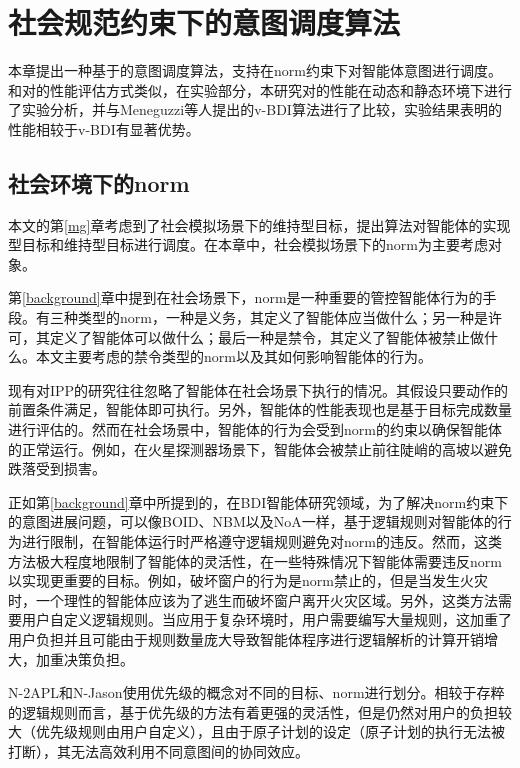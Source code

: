 \chapter{社会规范约束下的意图调度算法}\label{norm}
本章提出一种基于\SA 的意图调度算法\SAN ，\SAN 支持在norm约束下对智能体意图进行调度。和对\SAN 的性能评估方式类似，在实验部分，本研究对\SAN 的性能在动态和静态环境下进行了实验分析，并与Meneguzzi等人提出的v-BDI\cite{DBLP:journals/eaai/MeneguzziROVL15}算法进行了比较，实验结果表明\SAN 的性能相较于v-BDI有显著优势。
\section{社会环境下的norm}
本文的第\ref{mg}章考虑到了社会模拟场景下的维持型目标，提出\SAM 算法对智能体的实现型目标和维持型目标进行调度。在本章中，社会模拟场景下的norm为主要考虑对象。

第\ref{background}章中提到在社会场景下，norm是一种重要的管控智能体行为的手段\cite{DBLP:journals/mags/SavarimuthuC11}。有三种类型的norm，一种是义务，其定义了智能体应当做什么；另一种是许可，其定义了智能体可以做什么；最后一种是禁令，其定义了智能体被禁止做什么。本文主要考虑的禁令类型的norm以及其如何影响智能体的行为。

现有对IPP的研究往往忽略了智能体在社会场景下执行的情况。其假设只要动作的前置条件满足，智能体即可执行。另外，智能体的性能表现也是基于目标完成数量进行评估的。然而在社会场景中，智能体的行为会受到norm的约束以确保智能体的正常运行。例如，在火星探测器场景下，智能体会被禁止前往陡峭的高坡以避免跌落受到损害。

正如第\ref{background}章中所提到的，在BDI智能体研究领域，为了解决norm约束下的意图进展问题，可以像BOID\cite{DBLP:conf/agents/BroersenDHHT01}、NBM\cite{DBLP:conf/atal/MeneguzziL09}以及NoA\cite{DBLP:conf/ijcai/KollingbaumN03}一样，基于逻辑规则对智能体的行为进行限制，在智能体运行时严格遵守逻辑规则避免对norm的违反。然而，这类方法极大程度地限制了智能体的灵活性，在一些特殊情况下智能体需要违反norm以实现更重要的目标。例如，破坏窗户的行为是norm禁止的，但是当发生火灾时，一个理性的智能体应该为了逃生而破坏窗户离开火灾区域。另外，这类方法需要用户自定义逻辑规则。当应用于复杂环境时，用户需要编写大量规则，这加重了用户负担并且可能由于规则数量庞大导致智能体程序进行逻辑解析的计算开销增大，加重决策负担。

N-2APL\cite{DBLP:conf/aamas/AlechinaDL12}和N-Jason\cite{DBLP:conf/dalt/LeePLDA14}使用优先级的概念对不同的目标、norm进行划分。相较于存粹的逻辑规则而言，基于优先级的方法有着更强的灵活性，但是仍然对用户的负担较大（优先级规则由用户自定义），且由于原子计划的设定（原子计划的执行无法被打断），其无法高效利用不同意图间的协同效应。

